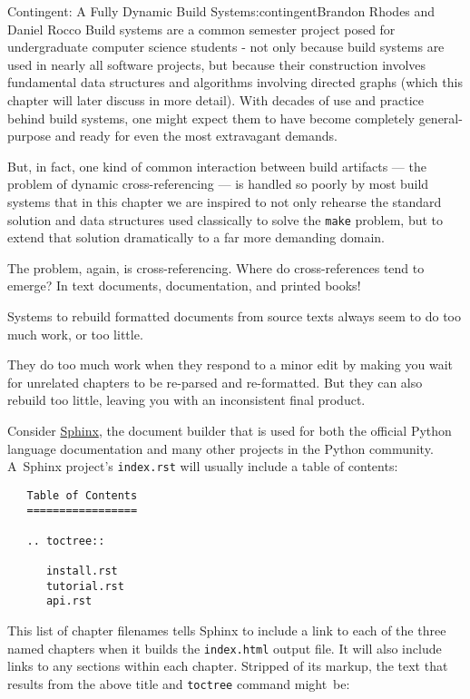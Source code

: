 \begin{aosachapter}{Contingent: A Fully Dynamic Build System}{s:contingent}{Brandon Rhodes and Daniel Rocco}
Build systems are a common semester project posed for undergraduate
computer science students - not only because build systems are used in
nearly all software projects, but because their construction involves
fundamental data structures and algorithms involving directed graphs
(which this chapter will later discuss in more detail). With decades of
use and practice behind build systems, one might expect them to have
become completely general-purpose and ready for even the most
extravagant demands.

But, in fact, one kind of common interaction between build artifacts ---
the problem of dynamic cross-referencing --- is handled so poorly by
most build systems that in this chapter we are inspired to not only
rehearse the standard solution and data structures used classically to
solve the \texttt{make} problem, but to extend that solution
dramatically to a far more demanding domain.

The problem, again, is cross-referencing. Where do cross-references tend
to emerge? In text documents, documentation, and printed books!

\label{the-problem-building-document-systems}

Systems to rebuild formatted documents from source texts always seem to
do too much work, or too little.

They do too much work when they respond to a minor edit by making you
wait for unrelated chapters to be re-parsed and re-formatted. But they
can also rebuild too little, leaving you with an inconsistent final
product.

Consider \href{http://sphinx-doc.org/}{Sphinx}, the document builder
that is used for both the official Python language documentation and
many other projects in the Python community. A~Sphinx project's
\texttt{index.rst} will usually include a table of contents:

\begin{verbatim}
   Table of Contents
   =================

   .. toctree::

      install.rst
      tutorial.rst
      api.rst
\end{verbatim}

This list of chapter filenames tells Sphinx to include a link to each of
the three named chapters when it builds the \texttt{index.html} output
file. It will also include links to any sections within each chapter.
Stripped of its markup, the text that results from the above title and
\texttt{toctree} command might~be:


\end{aosachapter}

